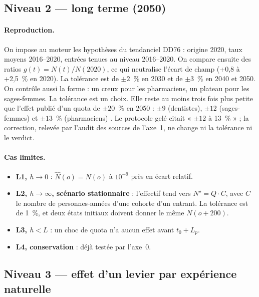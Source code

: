 \documentclass[11pt]{article}
\begin{document}
\subsection{Niveau 2 --- long terme (2050)}
\paragraph{Reproduction.} On impose au moteur les hypothèses du tendanciel DD76 : origine 2020, taux
moyens 2016--2020, entrées tenues au niveau 2016--2020. On compare ensuite des ratios
$g(t) = N(t)/N(2020)$, ce qui neutralise l'écart de champ (+0,8 à +2,5\mesure{}~\% en 2020). La
tolérance est de $\pm 2$\suppose{}~\% en 2030 et de $\pm 3$\suppose{}~\% en 2040 et 2050. On
contrôle aussi la forme : un creux pour les pharmaciens, un plateau pour les sages-femmes. La
tolérance est un choix. Elle reste au moins trois fois plus petite que l'effet publié d'un quota
de $\pm 20$~\% en 2050 : $\pm 9$ (dentistes), $\pm 12$ (sages-femmes) et $\pm 13$\mesure{}~\%
(pharmaciens) \citep[p.~3 et 58--59]{drees2021dd76}. Le protocole gelé citait « $\pm 12$ à 13~\% » ;
la correction, relevée par l'audit des sources de l'axe~1, ne change ni la tolérance ni le verdict.

\paragraph{Cas limites.}
\begin{itemize}
  \item \textbf{L1, $h \to 0$} : $\hat N(o) = N(o)$ à $10^{-9}$ près en écart relatif.
  \item \textbf{L2, $h \to \infty$, scénario stationnaire} : l'effectif tend vers
        $N^\star = Q \cdot C$, avec $C$ le nombre de personnes-années d'une cohorte d'un entrant. La
        tolérance est de 1\suppose{}~\%, et deux états initiaux doivent donner le même $N(o+200)$.
  \item \textbf{L3, $h < L$} : un choc de quota n'a aucun effet avant $t_0 + L_p$.
  \item \textbf{L4, conservation} : déjà testée par l'axe~0.
\end{itemize}

\subsection{Niveau 3 --- effet d'un levier par expérience naturelle}
\end{document}
